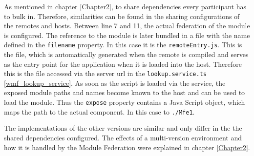 As mentioned in chapter \ref{Chapter2}, to share dependencies every participant has to bulk in. Therefore, similarities can be found in the sharing configurations of the remotes and hosts. 
Between line 7 and 11, the actual federation of the module is configured. The reference to the module is later bundled in a file with the name defined in the \texttt{filename} property. In this case it is the \texttt{remoteEntry.js}.
This is the file, which is automatically generated when the remote is compiled and serves as the entry point for the application when it is loaded into the host. Therefore this is the file accessed via the server url in the \texttt{lookup.service.ts} \ref{wmf_lookup_service}.
As soon as the script is loaded via the service, the exposed module paths and names become known to the host and can be used to load the module. Thus the \texttt{expose} property contains a Java Script object, which maps the path to the actual component. In this case to \texttt{./Mfe1}.\cite{wmf_concepts}

The implementations of the other versions are similar and only differ in the the shared dependencies configured. The effects of a multi-version environment and how it is handled by the Module Federation were explained in chapter \ref{Chapter2}.